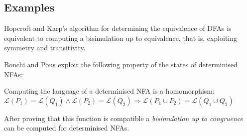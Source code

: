 \subsection{Examples}

Hopcroft and Karp's algorithm for determining the equivalence of DFAs is
equivalent to computing a bisimulation up to equivalence, that is, exploiting
symmetry and transitivity.

Bonchi and Pous exploit the following property of the states of determinised NFAs:

\begin{corollary}
  Computing the language of a determinised NFA is a homomorphism:\\
  $\mathcal{L}(P_1) = \mathcal{L}(Q_1) \land \mathcal{L}(P_2) = \mathcal{L}(Q_2)
    \Rightarrow \mathcal{L}(P_1 \cup P_2) = \mathcal{L}(Q_1 \cup Q_2)$
\end{corollary}

After proving that this function is compatible a
\textit{bisimulation up to congruence} can be computed for determinised NFAs.
